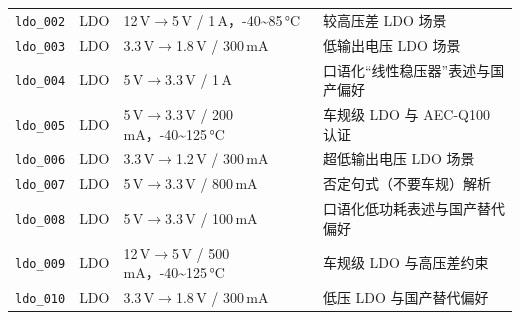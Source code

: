 \begin{longtable}{p{2.1cm}p{1.3cm}p{5.0cm}p{5.4cm}}
\texttt{ldo\_002} & LDO & 12\,V$\rightarrow$5\,V / 1\,A，-40\textasciitilde{}85\,°C & 较高压差 LDO 场景 \\
\texttt{ldo\_003} & LDO & 3.3\,V$\rightarrow$1.8\,V / 300\,mA & 低输出电压 LDO 场景 \\
\texttt{ldo\_004} & LDO & 5\,V$\rightarrow$3.3\,V / 1\,A & 口语化“线性稳压器”表述与国产偏好 \\
\texttt{ldo\_005} & LDO & 5\,V$\rightarrow$3.3\,V / 200\,mA，-40\textasciitilde{}125\,°C & 车规级 LDO 与 AEC-Q100 认证 \\
\texttt{ldo\_006} & LDO & 3.3\,V$\rightarrow$1.2\,V / 300\,mA & 超低输出电压 LDO 场景 \\
\texttt{ldo\_007} & LDO & 5\,V$\rightarrow$3.3\,V / 800\,mA & 否定句式（不要车规）解析 \\
\texttt{ldo\_008} & LDO & 5\,V$\rightarrow$3.3\,V / 100\,mA & 口语化低功耗表述与国产替代偏好 \\
\texttt{ldo\_009} & LDO & 12\,V$\rightarrow$5\,V / 500\,mA，-40\textasciitilde{}125\,°C & 车规级 LDO 与高压差约束 \\
\texttt{ldo\_010} & LDO & 3.3\,V$\rightarrow$1.8\,V / 300\,mA & 低压 LDO 与国产替代偏好 \\
\end{longtable}